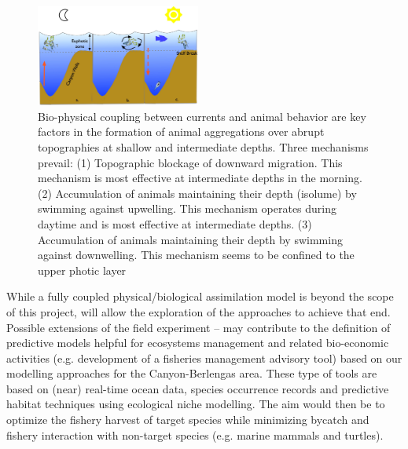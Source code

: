 \begin{figure}
  \vspace{-0.5cm}
  \centering
  \includegraphics[width=0.48\textwidth]{fig/plankton-canyon.jpg}
  \caption{Bio-physical coupling between currents and animal behavior
    are key factors in the formation of animal aggregations over
    abrupt topographies at shallow and intermediate depths. Three
    mechanisms prevail: (1) Topographic blockage of downward
    migration. This mechanism is most effective at intermediate depths
    in the morning. (2) Accumulation of animals maintaining their
    depth (isolume) by swimming against upwelling. This mechanism
    operates during daytime and is most effective at intermediate
    depths. (3) Accumulation of animals maintaining their depth by
    swimming against downwelling. This mechanism seems to be confined
    to the upper photic layer \cite{genin04}}
  \label{fig:plankton}
\end{figure}

While a fully coupled physical/biological assimilation model is beyond
the scope of this project, \proj will allow the exploration of the
approaches to achieve that end.  Possible extensions of the field
experiment – may contribute to the definition of predictive models
helpful for ecosystems management and related bio-economic activities
(e.g. development of a fisheries management advisory tool) based on
our modelling approaches for the \naz Canyon-Berlengas area. These
type of tools are based on (near) real-time ocean data, species
occurrence records and predictive habitat techniques using ecological
niche modelling. The aim would then be to optimize the fishery harvest
of target species while minimizing bycatch and fishery interaction
with non-target species (e.g. marine mammals and turtles).



